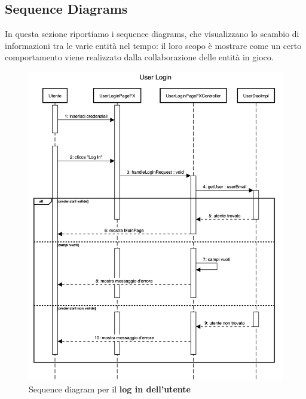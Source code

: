 \documentclass[12pt,a4paper]{article}
\begin{document}
	\subsection{Sequence Diagrams}
	In questa sezione riportiamo i sequence diagrams, che visualizzano lo scambio di informazioni tra le varie entità nel tempo: il loro scopo è mostrare come un certo comportamento viene realizzato dalla collaborazione delle entità in gioco.
	\begin{figure}[h!]
		\centering
		\includegraphics[scale=0.45]{images/SequenceDiagrams/UserLogin.png}
		\caption{Sequence diagram per il \textbf{log in dell'utente}}
	\end{figure}
	\newpage
\end{document}
